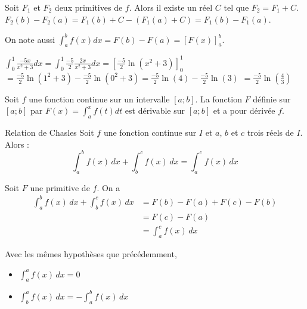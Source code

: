 \documentclass[french]{book}
\begin{document}
\begin{demo}
Soit $F_1$ et $F_2$ deux primitives de $f$. Alors il existe un réel $C$ tel que $F_2=F_1+C$. $F_2(b)-F_2(a)=F_1(b)+C-(F_1(a)+C)=F_1(b)-F_1(a)$.
\end{demo}


\begin{rem}
On note aussi $\int_{a}^{b}f(x)dx=F(b)-F(a)=[F(x)]_{a}^{b}$.
\end{rem}

\begin{exemple}
$\int_{0}^{1}\frac{-5x}{x^2+3}dx=\int_{0}^{1}\frac{-5}{2}\frac{2x}{x^2+3}dx=[\frac{-5}{2}\ln(x^2+3)]_0^{1}$\\
$=\frac{-5}{2}\ln(1^2+3)-\frac{-5}{2}\ln(0^2+3)=\frac{-5}{2}\ln(4)-\frac{-5}{2}\ln(3)$
$=\frac{-5}{2}\ln(\frac{4}{3})$
\end{exemple}

\newpage


\begin{thm}
 Soit $f$ une fonction continue sur un intervalle $[a;b]$. La fonction $F$ définie sur $[a;b]$ par $F(x)=\int_{a}^{x}f(t)dt$ est dérivable sur $[a;b]$ et a pour dérivée $f$.
\end{thm}


\begin{prop}{Relation de Chasles}
 Soit $f$ une fonction continue sur $I$ et $a$, $b$ et $c$ trois réels de $I$. Alors :
$$\int_{a}^{b}f(x)\,dx+\int_{b}^{c}f(x)\,dx=\int_{a}^{c}f(x)\,dx$$
\end{prop}

\begin{demo}
 Soit $F$ une primitive de $f$. On a
\begin{align*} \int_{a}^{b}f(x)\,dx+\int_{b}^{c}f(x)\,dx&=F(b)-F(a)+F(c)-F(b)\\
 &=F(c)-F(a)\\
 &=\int_{a}^{c}f(x)\,dx
\end{align*}
\end{demo}


\begin{cor}[Conséquences]
Avec les mêmes hypothèses que précédemment, 
\begin{itemize}
\item[$\bullet$] $\int_{a}^{a}f(x)\,dx=0$
 \item[$\bullet$] $\int_{b}^{a}f(x)\,dx=-\int_{a}^{b}f(x)\,dx$

 \end{itemize}
\end{cor}
\end{document}
